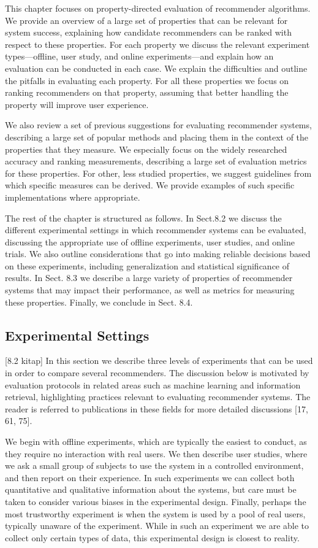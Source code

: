This chapter focuses on property-directed evaluation of recommender algorithms. We provide an overview of a large set of properties that can be relevant for system success, explaining how candidate recommenders can be ranked with respect to these properties. For each property we discuss the relevant experiment types—offline, user study, and online experiments—and explain how an evaluation can be conducted in each case. We explain the difficulties and outline the pitfalls in evaluating each property. For all these properties we focus on ranking recommenders on that property, assuming that better handling the property will improve user experience.

We also review a set of previous suggestions for evaluating recommender systems, describing a large set of popular methods and placing them in the context of the properties that they measure. We especially focus on the widely researched accuracy and ranking measurements, describing a large set of evaluation metrics for these properties. For other, less studied properties, we suggest guidelines from which specific measures can be derived. We provide examples of such specific implementations where appropriate.

The rest of the chapter is structured as follows. In Sect.8.2 we discuss the different experimental settings in which recommender systems can be evaluated, discussing the appropriate use of offline experiments, user studies, and online trials. We also outline considerations that go into making reliable decisions based on these experiments, including generalization and statistical significance of results. In Sect. 8.3 we describe a large variety of properties of recommender systems that may impact their performance, as well as metrics for measuring these properties. Finally, we conclude in Sect. 8.4.

\subsection{Experimental Settings}
[8.2 kitap]
In this section we describe three levels of experiments that can be used in order to compare several recommenders. The discussion below is motivated by evaluation protocols in related areas such as machine learning and information retrieval, highlighting practices relevant to evaluating recommender systems. The reader is referred to publications in these fields for more detailed discussions [17, 61, 75].

We begin with offline experiments, which are typically the easiest to conduct, as they require no interaction with real users. We then describe user studies, where we ask a small group of subjects to use the system in a controlled environment, and then report on their experience. In such experiments we can collect both quantitative and qualitative information about the systems, but care must be taken to consider various biases in the experimental design. Finally, perhaps the most trustworthy experiment is when the system is used by a pool of real users, typically unaware of the experiment. While in such an experiment we are able to collect only certain types of data, this experimental design is closest to reality.


